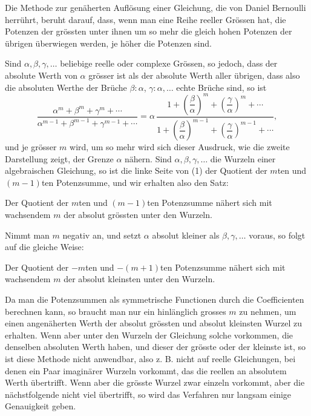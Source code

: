 \documentclass[11pt]{article}
\begin{document}
Die Methode zur genäherten Auflösung einer Gleichung, die von Daniel Bernoulli herrührt, beruht darauf, dass, wenn man eine Reihe reeller Grössen hat, die Potenzen der grössten unter ihnen um so mehr die gleich hohen Potenzen der übrigen überwiegen werden, je höher die Potenzen sind.

Sind $\alpha,\beta,\gamma,\ldots$ beliebige reelle oder complexe Grössen, so jedoch, dass der absolute Werth von $\alpha$ grösser ist als der absolute Werth aller übrigen, dass also die absoluten Werthe der Brüche $\beta:\alpha$, $\gamma:\alpha,\ldots$ echte Brüche sind, so ist
\begin{equation}
\frac{\alpha^m+\beta^m+\gamma^m+\cdots}
     {\alpha^{m-1}+\beta^{m-1}+\gamma^{m-1}+\cdots}
=
\alpha\,
\frac{1+\left(\dfrac{\beta}{\alpha}\right)^m+
        \left(\dfrac{\gamma}{\alpha}\right)^m+\cdots}
     {1+\left(\dfrac{\beta}{\alpha}\right)^{m-1}+
        \left(\dfrac{\gamma}{\alpha}\right)^{m-1}+\cdots},
\tag{1}
\end{equation}
und je grösser $m$ wird, um so mehr wird sich dieser Ausdruck, wie die zweite Darstellung zeigt, der Grenze $\alpha$ nähern. Sind $\alpha,\beta,\gamma,\ldots$ die Wurzeln einer algebraischen Gleichung, so ist die linke Seite von (1) der Quotient der $m$ten und $(m-1)$ten Potenzsumme, und wir erhalten also den Satz:

Der Quotient der $m$ten und $(m-1)$ten Potenzsumme nähert sich mit wachsendem $m$ der absolut grössten unter den Wurzeln.

Nimmt man $m$ negativ an, und setzt $\alpha$ absolut kleiner als $\beta,\gamma,\ldots$ voraus, so folgt auf die gleiche Weise:

Der Quotient der $-m$ten und $-(m+1)$ten Potenzsumme nähert sich mit wachsendem $m$ der absolut kleinsten unter den Wurzeln.

Da man die Potenzsummen als symmetrische Functionen durch die Coefficienten berechnen kann, so braucht man nur ein hinlänglich grosses $m$ zu nehmen, um einen angenäherten Werth der absolut grössten und absolut kleinsten Wurzel zu erhalten. Wenn aber unter den Wurzeln der Gleichung solche vorkommen, die denselben absoluten Werth haben, und dieser der grösste oder der kleinste ist, so ist diese Methode nicht anwendbar, also z. B. nicht auf reelle Gleichungen, bei denen ein Paar imaginärer Wurzeln vorkommt, das die reellen an absolutem Werth übertrifft. Wenn aber die grösste Wurzel zwar einzeln vorkommt, aber die nächstfolgende nicht viel übertrifft, so wird das Verfahren nur langsam einige Genauigkeit geben.
\end{document}
